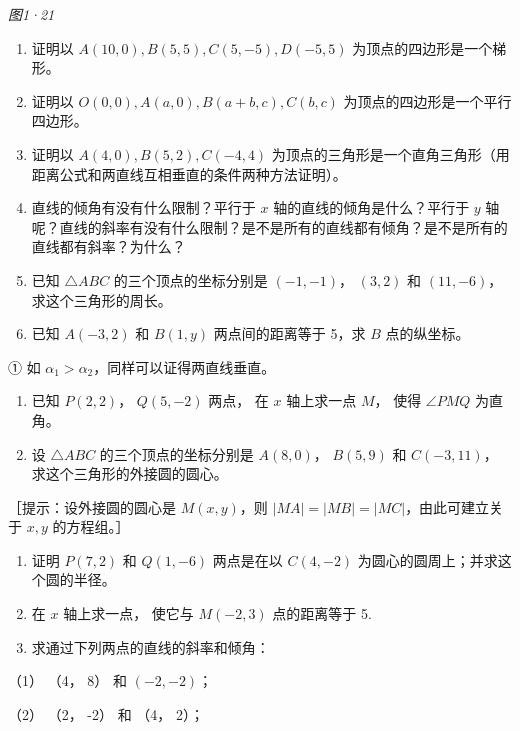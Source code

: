 \emph{图1·21}

\begin{enumerate}
\def\labelenumi{\arabic{enumi}.}
\item
  证明以 \(A(10,0), B(5,5), C(5,-5), D(-5,5)\)
  为顶点的四边形是一个梯形。
\item
  证明以 \(O(0,0), A(a,0), B(a+b,c), C(b,c)\)
  为顶点的四边形是一个平行四边形。
\item
  证明以 \(A(4,0), B(5,2), C(-4,4)\)
  为顶点的三角形是一个直角三角形（用距离公式和两直线互相垂直的条件两种方法证明）。
\item
  直线的倾角有没有什么限制？平行于 \(x\) 轴的直线的倾角是什么？平行于
  \(y\)
  轴呢？直线的斜率有没有什么限制？是不是所有的直线都有倾角？是不是所有的直线都有斜率？为什么？
\item
  已知 \(\triangle ABC\) 的三个顶点的坐标分别是 \((-1, -1)\)，
  \((3, 2)\) 和 \((11, -6)\)， 求这个三角形的周长。
\item
  已知 \(A(-3, 2)\) 和 \(B(1, y)\) 两点间的距离等于 5，求 \(B\)
  点的纵坐标。
\end{enumerate}

① 如 \(\alpha_{1} > \alpha_{2}\)，同样可以证得两直线垂直。

\begin{enumerate}
\def\labelenumi{\arabic{enumi}.}
\setcounter{enumi}{3}
\item
  已知 \(P(2, 2)\)， \(Q(5, -2)\) 两点， 在 \(x\) 轴上求一点 \(M\)，
  使得 \(\angle PMQ\) 为直角。
\item
  设 \(\triangle ABC\) 的三个顶点的坐标分别是 \(A(8,0)\)， \(B(5,9)\) 和
  \(C(-3,11)\)， 求这个三角形的外接圆的圆心。
\end{enumerate}

［提示：设外接圆的圆心是 \(M(x, y)\)，则
\(|MA| = |MB| = |MC|\)，由此可建立关于 \(x, y\) 的方程组。］

\begin{enumerate}
\def\labelenumi{\arabic{enumi}.}
\setcounter{enumi}{5}
\item
  证明 \(P(7, 2)\) 和 \(Q(1, -6)\) 两点是在以 \(C(4, -2)\)
  为圆心的圆周上；并求这个圆的半径。
\item
  在 \(x\) 轴上求一点， 使它与 \(M(-2,3)\) 点的距离等于 5.
\item
  求通过下列两点的直线的斜率和倾角：
\end{enumerate}

（1） （4， 8） 和 \((-2, -2)\)；

（2） （2， -2） 和 （4， 2）；


